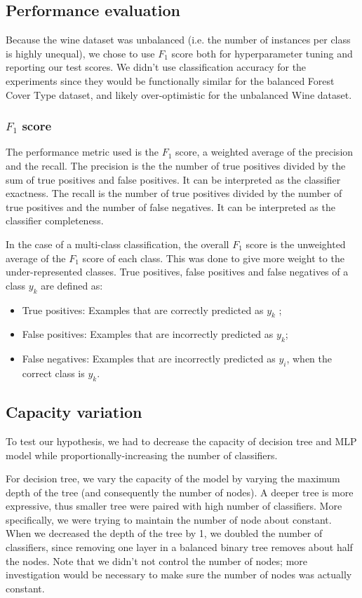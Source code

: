 \documentclass{article}
\begin{document}
\subsection{Performance evaluation}
Because the wine dataset was unbalanced (i.e. the number of instances per class is highly unequal), we chose to use $F_1$ score both for hyperparameter tuning and reporting our test scores. We didn't use classification accuracy for the experiments since they would be functionally similar for the balanced Forest Cover Type dataset, and likely over-optimistic for the unbalanced Wine dataset.

\subsubsection{$F_1$ score}
The performance metric used is the $F_1$ score, a weighted average of the precision and the recall. The precision is the the number of true positives divided by the sum of true positives and false positives. It can be interpreted as the classifier exactness. The recall is the number of true positives divided by the number of true positives and the number of false negatives. It can be interpreted as the classifier completeness.

In the case of a multi-class classification, the overall $F_1$ score is the unweighted average of the $F_1$ score of each class. This was done to give more weight to the under-represented classes. True positives, false positives and false negatives of a class $y_k$ are defined as:
\begin{itemize}
    \item True positives: Examples that are correctly predicted as $y_k$ ;
    \item False positives: Examples that are incorrectly predicted as $y_k$;
    \item False negatives: Examples that are incorrectly predicted as $y_i$, when the correct class is $y_k$.
\end{itemize}

\subsection{Capacity variation}
To test our hypothesis, we had to decrease the capacity of decision tree and MLP model while proportionally-increasing the number of classifiers. 

For decision tree, we vary the capacity of the model by varying the maximum depth of the tree (and consequently the number of nodes). A deeper tree is more expressive, thus smaller tree were paired with high number of classifiers. More specifically, we were trying to maintain the number of node about constant. When we decreased the depth of the tree by 1, we doubled the number of classifiers, since removing one layer in a balanced binary tree removes about half the nodes. Note that we didn't not control the number of nodes; more investigation would be necessary to make sure the number of nodes was actually constant.
\end{document}
